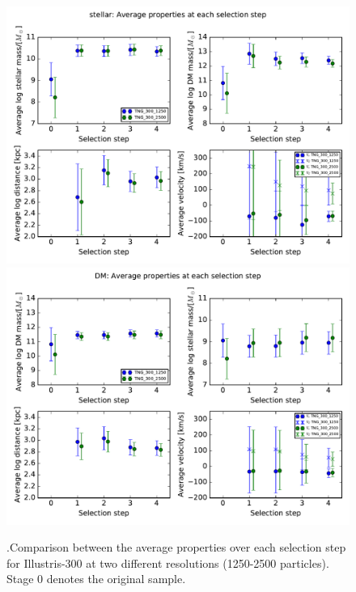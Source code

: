 \documentclass[fleqn,usenatbib]{mnras}
\begin{document}
\begin{figure}
\centering
\includegraphics[scale=0.4]{avgProp/stellar_avgPropsTNG_300_1250TNG_300_2500}
\includegraphics[scale=0.4]{avgProp/DM_avgPropsTNG_300_1250TNG_300_2500}
\caption{\label{fig:prop_300_300} .Comparison between the average properties over each selection step for Illustris-300 at two different resolutions (1250-2500 particles). Stage $0$ denotes the original sample.}
\end{figure}
\end{document}
